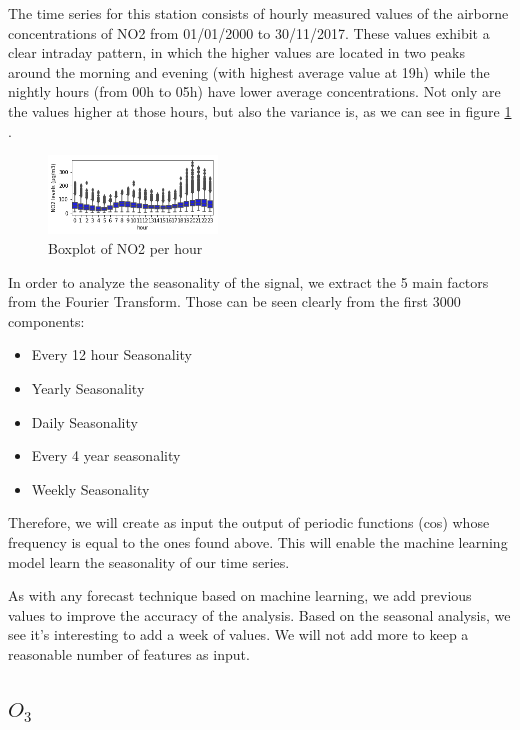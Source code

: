 \documentclass[a4paper,twocolumn,5p]{elsarticle}
\begin{document}
The time series for this station consists of hourly
measured values of the airborne concentrations of NO2
from 01/01/2000 to 30/11/2017. These values exhibit a clear intraday 
pattern, in which the
higher values are located in two peaks around the morning
and evening (with highest average value at 19h) while the 
nightly hours (from 00h to 05h) have lower average concentrations. 
Not only are the values higher at those hours, but also
the variance is, as we can see in figure \ref{figure:variance} . 
 
\begin{figure}
  \centering
      \includegraphics[width=0.4\textwidth]{NO2Var}
  \caption{Boxplot of NO2 per hour}
\label{figure:variance}
\end{figure}

In order to analyze the seasonality of the signal, we extract the 5 main factors 
from the Fourier Transform. Those can be seen clearly from the first 3000 components:

\begin{itemize}
  \item Every 12 hour Seasonality
  \item Yearly Seasonality
  \item Daily Seasonality
  \item Every 4 year seasonality
  \item Weekly Seasonality
\end{itemize} 

Therefore, we will create as input the output of periodic functions (cos) whose frequency is equal to the ones found 
above. This will enable the machine learning model learn the seasonality of our time series.

As with any forecast technique based on machine learning, we add previous values to improve the accuracy 
of the analysis. Based on the seasonal analysis, we see it's interesting to add a week of values. We will not 
add more to keep a reasonable number of features as input.

\subsection{$O_3$}
\end{document}
